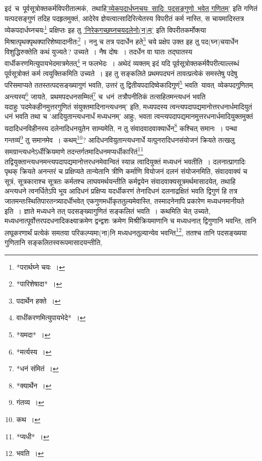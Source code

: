 \documentclass[10pt, openany]{book}
\begin{document}
{{{{{{इदं \,च \,पूर्वसूत्रोक्तकर्मविपरीतात्मकं, \,तथाहि\textendash \;\hyperref[85]{'व्येकपदार्धघ्नचयः \,सादिः \,पदसङ्गुणो \,भवेत् गणितम्'} इति गणितं यत्पदसङ्गुणं तदिह पदहृतमुक्तं, आदेरेव
ज्ञेयत्वात्सादिरित्येतस्य}
{विपरीतं कर्म नास्ति, स चायमादिस्तत्र व्येकपदार्धघ्नचयः\renewcommand{\thefootnote}{४}\footnote{*परार्थघ्ने चयः~।} प्रक्षिप्तः
इह तु \hyperref[86.1]{'निरेकगच्छघ्नचयदलेनो(न)म्'} इति विपरीतकर्मोक्त्या मिश्रात्पृथक्पृथक्पारिशेष्यादानीतः\renewcommand{\thefootnote}{५}\footnote{*पारिशेषादा*~।}\,। ननु च तत्र पदार्धेन}
{हते\renewcommand{\thefootnote}{६}\footnote{पदार्थेन हक्ते~।} चये प्रक्षेप उक्त इह तु पद(घ्न)चयार्धेन विशुद्धिरुक्तेति कथं
युज्यते\,? उच्यते~। नैष दोषः~।}
{तदर्धेन वा घातः तद्घातस्य वार्धीकरणमित्युपायभेदमात्रमेतत्\renewcommand{\thefootnote}{७}\footnote{वाधींकरणमित्युपायभेदे*~।} न फलभेदः~। अथेदं व्यक्तम्}
{इदं यदि पूर्वसूत्रोक्तकर्मवैपरीत्याल्लब्धं पूर्वसूत्रोक्तं कर्म
त्वयुक्तिकमिति उच्यते~। इह तु सङ्कलिते}
{प्रथमपदघनं तावत्प्रत्येकं समस्तेषु पदेषु परिसमाप्यते
ततस्तत्पदसङ्ख्यागुणं भवति, उत्तरं तु}
{द्वितीयपदादिष्वेकादिगुणं\renewcommand{\thefootnote}{८}\footnote{*यमदा*~।} भवति \,यावत् \,व्येकपदगुणितम् \,अन्त्यस्य\renewcommand{\thefootnote}{९}\footnote{*मर्त्यस्य~।}
जायते, \,प्रथमपदधनसम्मितं\renewcommand{\thefootnote}{१०}\footnote{*धनं संमितं~।}}
{च \,धनं \,तत्रौपनीतिकं तत्सहितमन्त्यधनं भवति यदाहुः\textendash \,{\qt 'पदमेकहीनमुत्तरगुणितं संयुक्तमादिनान्त्यधनम्'} इति, मध्यपदस्य
त्वन्त्यपदापद्यमानोत्तरधनार्धमादियुतं धनं भवति}
{तथा च {\qt 'आदियुतान्त्यधनार्धं मध्यधनम्'} आहुः, भवता
त्वन्त्यपदापद्यमानमुत्तरधनार्धमादियुक्तमुक्तं}
{यदादिधनविहीनस्य दलेनादिधनयुतेन साम्यमेति, न तु
संवादवादवाक्यार्धेन\renewcommand{\thefootnote}{११}\footnote{*क्यार्थेन~।} कश्चित् समानः~।}
{पन्था गन्तव्यं\renewcommand{\thefootnote}{१२}\footnote{गंतव्य~।} तु समानमेव~। कथम्\renewcommand{\thefootnote}{१३}\footnote{कथ~।}? आदिधनवियुतान्त्यधनार्धे
यत्पुनरादिधनसंयोजनं क्रियते}
{तत्खलु समग्रान्त्यधनेऽर्धीक्रियमाणे तदन्तर्गतमादिधनमप्यर्धीकारितं\renewcommand{\thefootnote}{१४}\footnote{*प्यधी*~।}
तद्वियुक्तान्त्यधनमन्त्यपदापद्यमानोत्तरधनमेवान्वितं स्यान्न त्वादियुक्तं मध्यधनं भवतीति~। 
दलनात्प्रागादिः पृथक् क्रियते}
{अनन्तरं च प्रक्षिप्यते तान्येतानि त्रीणि कर्माणि वियोजनं दलनं
संयोजनमिति, संवादवाक्यं च}
{सूत्रं, सूत्रकाराश्च सूत्रतः कर्मतश्च लाघवमर्थयन्तीति कर्मद्वयेन
संवादवाक्यसूत्रमर्थमासादयेत्,}
{तथाहि अन्त्यधने त्वनर्धितेऽपि भूय आदिधनं प्रक्षिप्य यदर्धीकरणं
तेनादिधनं दलनाद्रक्षितं भवति}
{द्विगुणं हि तत्र जातमन्तःस्थितिपारतन्त्र्यादर्धीभवेत्
एकगुणमर्धीकृततुल्यमेवास्ति, तस्मादनेनापि}
{प्रकारेण मध्यधनमानीयते इति~। ज्ञाते मध्यधने तत् पदसङ्ख्यागुणितं
सङ्कलितं भवति~। कथमिति चेत् उच्यते, मध्यधनात्पूर्वोत्तरपदधनादिकक्ष्याक्रमेण द्वन्द्वशः
क्रमेण मिश्रीक्रियमाणानि च}
{मध्यधनात् द्विगुणानि भवन्ति, तानि लघूकरणार्थं प्रत्येकं समतया
परिकल्प्यमा(ना)नि मध्यधनतुल्यान्येव भवन्ति\renewcommand{\thefootnote}{१५}\footnote{भवति~।}, ततश्च तानि पदसङ्ख्यया गुणितानि
सङ्कलितस्वरूपमासादयन्तीति,}

}}}}}
\end{document}

